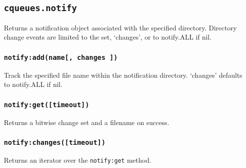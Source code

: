 \documentclass[11pt, oneside]{memoir}
\newcommand{\fn}[1]{\texttt{#1} }
\newcommand{\method}[1]{\texttt{#1} }
\newcounter{toccols}
\newenvironment{Module}[1]{
	\subsection{\texttt{#1}}
	\addtocontents{toc}{
		\protect\begin{multicols}{\value{toccols}}
	}
}{
	\addtocontents{toc}{\protect\end{multicols}}
}
\begin{document}
\begin{Module}{cqueues.notify}
Returns a notification object associated with the specified directory. Directory change events are limited to the set, `changes', or to notify.ALL if nil.

\subsubsection[\fn{notify:add}]{\fn{notify:add(name[, changes ])}}

Track the specified file name within the notification directory. `changes' defaults to notify.ALL if nil.

\subsubsection[\fn{notify:get}]{\fn{notify:get([timeout])}}

Returns a bitwise change set and a filename on success.

\subsubsection[\fn{notify:changes}]{\fn{notify:changes([timeout])}}

Returns an iterator over the \method{notify:get} method.

\end{Module}
\end{document}
